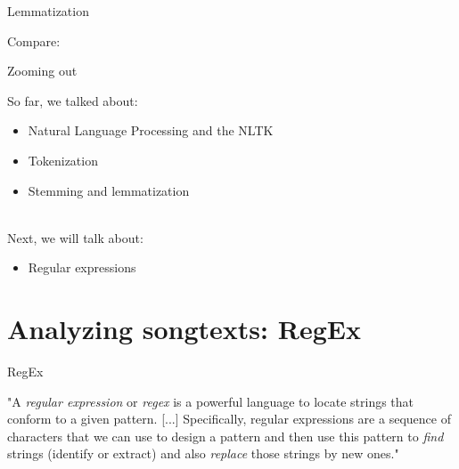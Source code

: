 \documentclass[handout]{beamer}
\begin{document}
\begin{frame}[fragile]{Lemmatization}
	
Compare:

\begin{lstlistingoutput}
\end{lstlistingoutput}

\begin{lstlistingoutput}
\end{lstlistingoutput}

\end{frame}


\begin{frame}{Zooming out} 
	
So far, we talked about:
\begin{itemize}
	\item Natural Language Processing and the NLTK
	\item Tokenization
	\item Stemming and lemmatization \\\
\end{itemize}
	
Next, we will talk about:
\begin{itemize}
	\item Regular expressions
\end{itemize}
	
\end{frame}




\section{Analyzing songtexts: RegEx}


\begin{frame}[fragile]{RegEx}
	
	"A \textit{regular expression} or \textit{regex} is a powerful language to locate strings that conform to a given pattern. [...] Specifically, regular expressions are a sequence of characters that we can use to design a pattern and then use this pattern to \textit{find} strings (identify or extract) and also \textit{replace} those strings by new ones." \\
	\begin{tiny}
		\cite{van_atteveldt_computational_2022} 
	\end{tiny}
	

\end{frame}
\end{document}
